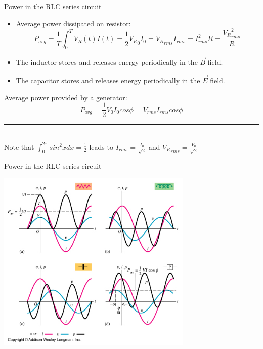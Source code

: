 %
%
%

\begin{frame}{Power in the RLC series circuit}

\begin{itemize}

\item
Average power dissipated on resistor:
\begin{equation*}
      P_{avg} = \frac{1}{T} \int_{0}^{T} V_R(t) I(t) = \frac{1}{2} {V_R}_0 I_0 = {V_R}_{rms} I_{rms} = I_{rms}^2 R = \frac{{V_R}_{rms}^2}{R}
\end{equation*}

\item
The inductor stores and releases energy periodically in the $\vec{B}$ field.

\item
The capacitor stores and releases energy periodically in the $\vec{E}$ field.

\end{itemize}

\vspace{0.2cm}

Average power provided by a generator:
\begin{equation*}
      P_{avg} = \frac{1}{2} V_0 I_0 cos\phi = V_{rms} I_{rms} cos\phi
\end{equation*}

\noindent\rule{2cm}{0.4pt}\\
{ \scriptsize
  Note that $\displaystyle \int_{0}^{2\pi} sin^2x dx = \frac{1}{2}$ leads to $\displaystyle I_{rms} = \frac{I_0}{\sqrt{2}}$
  and $\displaystyle {V_R}_{rms} = \frac{V_0}{\sqrt{2}}$
}

\end{frame}

%
%
%

\begin{frame}{Power in the RLC series circuit}

\begin{center}
   \includegraphics[width=0.70\textwidth]{./images/schematics/ac_rlc_power.png}\\
\end{center}

\end{frame}

